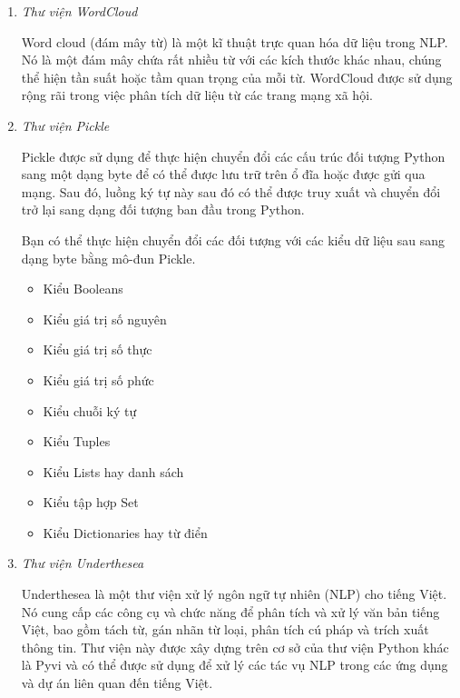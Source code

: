 \begin{enumerate}
    \item \textit{Thư viện WordCloud}

          Word cloud (đám mây từ) là một kĩ thuật trực quan hóa dữ liệu trong NLP. Nó là một đám mây chứa rất nhiều từ với các kích thước khác nhau, chúng thể hiện tần suất hoặc tầm quan trọng của mỗi từ. WordCloud được sử dụng rộng rãi trong việc phân tích dữ liệu từ các trang mạng xã hội\cite{webpage17}.

    \item \textit{Thư viện Pickle}

          Pickle được sử dụng để thực hiện chuyển đổi các cấu trúc đối tượng Python sang một dạng byte để có thể được lưu trữ trên ổ đĩa hoặc được gửi qua mạng. Sau đó, luồng ký tự này sau đó có thể được truy xuất và chuyển đổi trở lại sang dạng đối tượng ban đầu trong Python\cite{webpage18}.

          Bạn có thể thực hiện chuyển đổi các đối tượng với các kiểu dữ liệu sau sang dạng byte bằng mô-đun Pickle.
          \begin{itemize}
              \item Kiểu Booleans
              \item Kiểu giá trị số nguyên
              \item Kiểu giá trị số thực
              \item Kiểu giá trị số phức
              \item Kiểu chuỗi ký tự
              \item Kiểu Tuples
              \item Kiểu Lists hay danh sách
              \item Kiểu tập hợp Set
              \item Kiểu Dictionaries hay từ điển
          \end{itemize}

    \item \textit{Thư viện Underthesea}

          Underthesea là một thư viện xử lý ngôn ngữ tự nhiên (NLP) cho tiếng Việt. Nó cung cấp các công cụ và chức năng để phân tích và xử lý văn bản tiếng Việt, bao gồm tách từ, gán nhãn từ loại, phân tích cú pháp và trích xuất thông tin. Thư viện này được xây dựng trên cơ sở của thư viện Python khác là Pyvi và có thể được sử dụng để xử lý các tác vụ NLP trong các ứng dụng và dự án liên quan đến tiếng Việt.


\end{enumerate}
